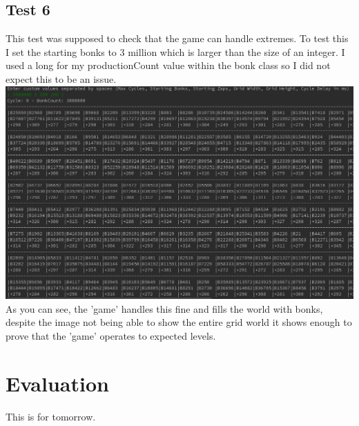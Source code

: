 \documentclass[12pt]{article}
\begin{document}
\subsection{Test 6}
This test was supposed to check that the game can handle extremes. To test this I set the starting bonks to 3 million which is larger than the size of an integer. I used a long for my productionCount value within the bonk class so I did not expect this to be an issue.\\
\includegraphics[width=15cm]{test6}
As you can see, the 'game' handles this fine and fills the world with bonks, despite the image not being able to show the entire grid world it shows enough to prove that the 'game' operates to expected levels.
\section{Evaluation}
This is for tomorrow.


 
\end{document}
